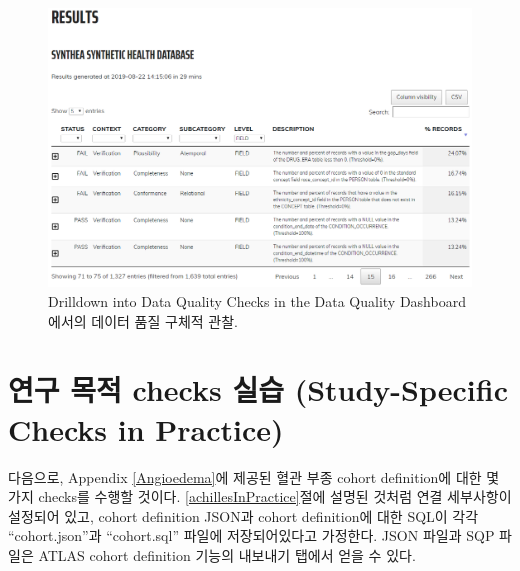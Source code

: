 \documentclass[11pt]{book}
\newenvironment{Shaded}{\begin{snugshade}}{\end{snugshade}}
\newcommand{\KeywordTok}[1]{\textcolor[rgb]{0.13,0.29,0.53}{\textbf{#1}}}
\newcommand{\DataTypeTok}[1]{\textcolor[rgb]{0.13,0.29,0.53}{#1}}
\newcommand{\StringTok}[1]{\textcolor[rgb]{0.31,0.60,0.02}{#1}}
\newcommand{\OperatorTok}[1]{\textcolor[rgb]{0.81,0.36,0.00}{\textbf{#1}}}
\newcommand{\NormalTok}[1]{#1}
\theoremstyle{definition}
\theoremstyle{definition}
\theoremstyle{definition}
\theoremstyle{remark}
\begin{document}
\begin{figure}

{\centering \includegraphics[width=1\linewidth]{images/DataQuality/dqdResults} 

}

\caption{Drilldown into Data Quality Checks in the Data Quality Dashboard 에서의 데이터 품질 구체적 관찰.}\label{fig:dqdResults}
\end{figure}

\section{연구 목적 checks 실습 (Study-Specific Checks in
Practice)}\label{--checks--study-specific-checks-in-practice}

다음으로, Appendix \ref{Angioedema}에 제공된 혈관 부종 cohort
definition에 대한 몇 가지 checks를 수행할 것이다.
\ref{achillesInPractice}절에 설명된 것처럼 연결 세부사항이 설정되어
있고, cohort definition JSON과 cohort definition에 대한 SQL이 각각
``cohort.json''과 ``cohort.sql'' 파일에 저장되어있다고 가정한다. JSON
파일과 SQP 파일은 ATLAS cohort definition 기능의 내보내기 탭에서 얻을 수
있다.

\begin{Shaded}
\end{Shaded}
\end{document}
